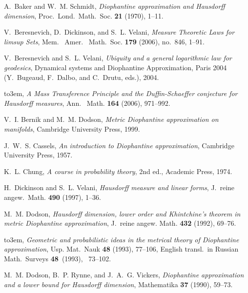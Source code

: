 \documentclass[reqno]{amsart}
\newcommand{\0}{{\mathbf{0}}}
\begin{document}
\providecommand{\bysame}{\leavevmode\hbox to3em{\hrulefill}\thinspace}
\providecommand{\MR}{\relax\ifhmode\unskip\space\fi MR }
\providecommand{\MRhref}[2]{
  \href{http://www.ams.org/mathscinet-getitem?mr=#1}{#2}
}
\providecommand{\href}[2]{#2}
\begin{thebibliography}{10}

A.~Baker and W.~M. Schmidt, \emph{Diophantine approximation and {H}ausdorff
  dimension}, Proc.\ Lond.\ Math.\ Soc. \textbf{21} (1970), 1--11.

V.~Beresnevich, D.~Dickinson, and S.~L. Velani, \emph{Measure {T}heoretic
  {L}aws for limsup {S}ets}, Mem. \ Amer. \ Math.\ Soc. \textbf{179} (2006),
  no.~846, 1--91.

V.~Beresnevich and S.~L. Velani, \emph{Ubiquity and a general logarithmic law
  for geodesics}, Dynamical systems and Diophantine Approximation, Paris 2004
  (Y.~Bugeaud, F.~Dalbo, and C.~Drutu, eds.), 2004.

\bysame, \emph{A {M}ass {T}ransference {P}rinciple and the {D}uffin-{S}chaeffer
  conjecture for {H}ausdorff measures}, Ann. \ Math. \textbf{164} (2006),
  971--992.

V.~I. Bernik and M.~M. Dodson, \emph{Metric {D}iophantine approximation on
  manifolds}, Cambridge University Press, 1999.

J.~W.~S. Cassels, \emph{An introduction to {D}iophantine approximation},
  Cambridge University Press, 1957.

K.~L. Chung, \emph{A course in probability theory}, 2nd ed., Academic Press,
  1974.

H.~Dickinson and S.~L. Velani, \emph{Hausdorff measure and linear forms}, J.\
  reine angew.\ Math. \textbf{490} (1997), 1--36.

M.~M. Dodson, \emph{Hausdorff dimension, lower order and {K}hintchine's theorem
  in metric {D}iophantine approximation}, J.\ reine angew. Math. \textbf{432}
  (1992), 69--76.

\bysame, \emph{Geometric and probabilistic ideas in the metrical theory of
  {D}iophantine approximation}, Usp. Mat.\ Nauk \textbf{48} (1993), 77--106,
  English transl.\ in Russian Math.\ Surveys {\bf 48}\ (1993), \ 73--102.

M.~M. Dodson, B.~P. Rynne, and J.~A.~G. Vickers, \emph{Diophantine
  approximation and a lower bound for {H}ausdorff dimension}, Mathematika
  \textbf{37} (1990), 59--73.


\end{thebibliography}
\end{document}
